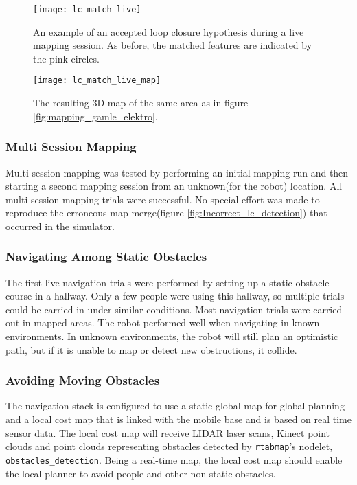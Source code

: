 \begin{figure}[h]
	\centering
	\texttt{[image: lc\_match\_live]}
	\caption{An example of an accepted loop closure hypothesis during a live mapping session. As before, the matched features are indicated by the pink circles.}
	\label{fig:lc_match_live}
\end{figure}

\begin{figure}[p]
	\centering
	\texttt{[image: lc\_match\_live\_map]}
	\caption{The resulting 3D map of the same area as in figure \ref{fig:mapping_gamle_elektro}.}
	\label{fig:lc_match_live_map}
\end{figure}

\subsubsection{Multi Session Mapping}

Multi session mapping was tested by performing an initial mapping run and then starting a second mapping session from an unknown(for the robot) location. All multi session mapping trials were successful. No special effort was made to reproduce the erroneous map merge(figure \ref{fig:Incorrect_lc_detection}) that occurred in the simulator. 

\subsubsection{Navigating Among Static Obstacles}

The first live navigation trials were performed by setting up a static obstacle course in a hallway. Only a few people were using this hallway, so multiple trials could be carried in under similar conditions. Most navigation trials were carried out in mapped areas. The robot performed well when navigating in known environments. In unknown environments, the robot will still plan an optimistic path, but if it is unable to map or detect new obstructions, it collide.



\subsubsection{Avoiding Moving Obstacles}

The navigation stack is configured to use a static global map for global planning and a local cost map that is linked with the mobile base and is based on real time sensor data. The local cost map will receive LIDAR laser scans, Kinect point clouds and point clouds representing obstacles detected by \texttt{rtabmap}'s nodelet, \texttt{obstacles\_detection}. Being a real-time map, the local cost map should enable the local planner to avoid people and other non-static obstacles.

